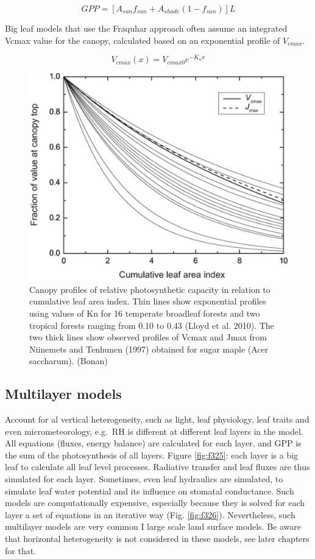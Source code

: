 \documentclass[12pt,oneside]{book}
\begin{document}
\[
GPP = \left[A_{sun} f_{sun} + A_{shade} (1 - f_{sun}) \right]L
\]

Big leaf models that use the Fraquhar approach often assume an
integrated Vcmax value for the canopy, calculated based on an
exponential profile of \(V_{cmax}\).

\[
V_{cmax}(x) = V_{cmax0} e^{-K_n x}
\]

\begin{figure}

{\centering \includegraphics[width=0.8\linewidth]{figures/chap3/f324_vcamx_profile} 

}

\caption{Canopy profiles of relative photosynthetic capacity in relation to cumulative leaf area index. Thin lines show exponential profiles using values of Kn for 16 temperate broadleaf forests and two tropical forests ranging from 0.10 to 0.43 (Lloyd et al. 2010). The two thick lines show observed profiles of Vcmax and Jmax from Niinemets and Tenhunen (1997) obtained for sugar maple (Acer saccharum). (Bonan)}\label{fig:f324}
\end{figure}

\subsection{Multilayer models}\label{multilayer-models}

Account for al vertical heterogeneity, such as light, leaf physiology,
leaf traits and even micrometeorology, e.g.~RH is different at different
leaf layers in the model. All equations (fluxes, energy balance) are
calculated for each layer, and GPP is the sum of the photosynthesis of
all layers. Figure \ref{fig:f325}: each layer is a big leaf to calculate
all leaf level processes. Radiative transfer and leaf fluxes are thus
simulated for each layer. Sometimes, even leaf hydraulics are simulated,
to simulate leaf water potential and its influence on stomatal
conductance. Such models are computationally expensive, especially
because they is solved for each layer a set of equations in an iterative
way (Fig. \ref{fig:f326}). Nevertheless, such multilayer models are very
common I large scale land surface models. Be aware that horizontal
heterogeneity is not considered in these models, see later chapters for
that.
\end{document}
